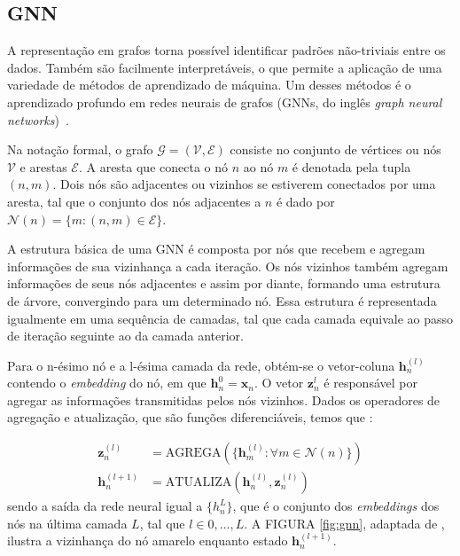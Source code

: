 \subsection{GNN}
A representação em grafos torna possível identificar padrões
não-triviais entre os dados. Também são facilmente interpretáveis, o que
permite a aplicação de uma variedade de métodos de aprendizado de máquina. Um
desses métodos é o aprendizado profundo em redes neurais de grafos (GNNs, do
inglês \textit{graph neural networks})~\cite{Bishop:DeepLearning24}.


Na notação formal, o grafo $\mathcal{G} = (\mathcal{V}, \mathcal{E})$ consiste no conjunto de
vértices ou nós $\mathcal{V}$ e arestas $\mathcal{E}$. A aresta que conecta
o nó $n$ ao nó $m$ é denotada pela tupla $(n, m)$. Dois nós são adjacentes ou vizinhos
se estiverem conectados por uma aresta, tal que o conjunto dos nós adjacentes a $n$
é dado por $\mathcal{N}(n) = \{m : (n, m) \in \mathcal{E}\}$.

A estrutura básica de uma GNN é composta por nós que recebem e agregam
informações de sua vizinhança a cada iteração. Os nós vizinhos também agregam
informações de seus nós adjacentes e assim por diante, formando uma estrutura de
árvore, convergindo para um determinado nó. Essa estrutura é representada
igualmente em uma sequência de camadas, tal que cada camada equivale ao passo de
iteração seguinte ao da camada anterior.

Para o n-ésimo nó e a l-ésima camada da rede, obtém-se o vetor-coluna
$\mathbf{h}^{(l)}_n$ contendo o \textit{embedding} do nó, em que
$\mathbf{h}^{0}_n = \mathbf{x}_n$. O vetor $\mathbf{z}^{l}_n$ é responsável
por agregar as informações transmitidas pelos nós vizinhos. Dados os operadores
de agregação e atualização, que são funções diferenciáveis, temos que \cite{Bishop:DeepLearning24}:

\begin{align}
    \mathbf{z}^{(l)}_n &= \text{AGREGA}( \{ \mathbf{h}^{(l)}_m : \forall m \in \mathcal{N}(n)\} ) \label{eq:agrega} \\
    \mathbf{h}^{(l+1)}_n &= \text{ATUALIZA}(\mathbf{h}^{(l)}_n, \mathbf{z}^{(l)}_n) \label{eq:atualiza}
\end{align}
sendo a saída da rede neural igual a $\{h^{L}_n\}$, que é o conjunto dos
\textit{embeddings} dos nós na última camada $L$, tal que $l \in {0, \ldots,
L}$. A FIGURA \ref{fig:gnn}, adaptada de \citet{graph_rep_learning}, ilustra
a vizinhança do nó amarelo enquanto estado $\mathbf{h}^{(l+1)}_n$.

